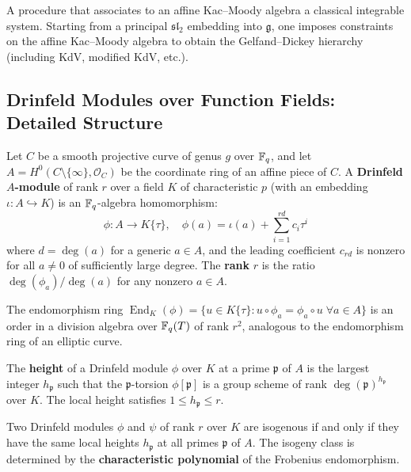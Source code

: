 \begin{definition}
A procedure that associates to an affine Kac--Moody algebra a classical integrable system. Starting from a principal $\mathfrak{sl}_2$ embedding into $\mathfrak{g}$, one imposes constraints on the affine Kac--Moody algebra to obtain the Gelfand--Dickey hierarchy (including KdV, modified KdV, etc.).
\end{definition}

\subsection{Drinfeld Modules over Function Fields: Detailed Structure}

\begin{definition}
Let $C$ be a smooth projective curve of genus $g$ over $\mathbb{F}_q$, and let $A = H^0(C \setminus \{\infty\}, \mathcal{O}_C)$ be the coordinate ring of an affine piece of $C$. A \textbf{Drinfeld $A$-module} of rank $r$ over a field $K$ of characteristic $p$ (with an embedding $\iota: A \hookrightarrow K$) is an $\mathbb{F}_q$-algebra homomorphism:
\[
\phi: A \to K\{\tau\}, \quad \phi(a) = \iota(a) + \sum_{i=1}^{rd} c_i \tau^i
\]
where $d = \deg(a)$ for a generic $a \in A$, and the leading coefficient $c_{rd}$ is nonzero for all $a \neq 0$ of sufficiently large degree. The \textbf{rank} $r$ is the ratio $\deg(\phi_a) / \deg(a)$ for any nonzero $a \in A$.
\end{definition}

The endomorphism ring $\operatorname{End}_K(\phi) = \{u \in K\{\tau\} : u \circ \phi_a = \phi_a \circ u \; \forall a \in A\}$ is an order in a division algebra over $\mathbb{F}_q(T)$ of rank $r^2$, analogous to the endomorphism ring of an elliptic curve.

\begin{definition}
The \textbf{height} of a Drinfeld module $\phi$ over $K$ at a prime $\mathfrak{p}$ of $A$ is the largest integer $h_{\mathfrak{p}}$ such that the $\mathfrak{p}$-torsion $\phi[\mathfrak{p}]$ is a group scheme of rank $\deg(\mathfrak{p})^{h_{\mathfrak{p}}}$ over $K$. The local height satisfies $1 \leq h_{\mathfrak{p}} \leq r$.
\end{definition}

\begin{theorem}
Two Drinfeld modules $\phi$ and $\psi$ of rank $r$ over $K$ are isogenous if and only if they have the same local heights $h_{\mathfrak{p}}$ at all primes $\mathfrak{p}$ of $A$. The isogeny class is determined by the \textbf{characteristic polynomial} of the Frobenius endomorphism.
\end{theorem}

